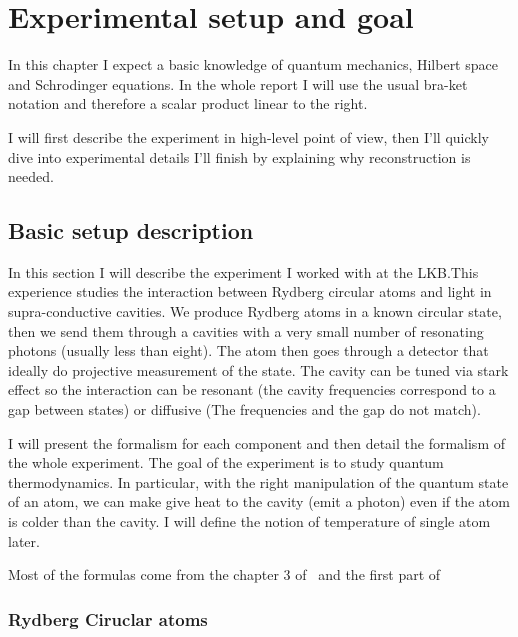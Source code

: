 \documentclass[10pt]{report}
\theoremstyle{plain}
\theoremstyle{definition}
\theoremstyle{remark}
\begin{document}
\vfill



\chapter{Experimental setup and goal}

In this chapter I expect a basic knowledge of quantum mechanics, Hilbert space and
Schrodinger equations. In the whole report I will use the usual bra-ket notation
and therefore a scalar product linear to the right.

I will first describe the experiment in high-level point of view, then I'll
quickly dive into experimental details I'll finish by explaining why
reconstruction is needed.

\section{Basic setup description}

In this section I will describe the experiment I worked with at the LKB.\@ This
experience studies the interaction between Rydberg circular atoms and light in
supra-conductive cavities.
We produce Rydberg atoms in a known circular state, then we send them through a
cavities with a very small number of resonating photons (usually less than
eight). The atom then goes through a detector that ideally do projective
measurement of the state. The cavity can be tuned via stark effect so the
interaction can be resonant (the cavity frequencies correspond to a gap between
states) or diffusive (The frequencies and the gap do not match).

I will present the formalism for each component and then detail the formalism of
the whole experiment. The goal of the experiment is to study quantum
thermodynamics. In particular, with the right manipulation of the quantum state
of an atom, we can make give heat to the cavity (emit a photon) even if the atom
is colder than the cavity. I will define the notion of temperature of single
atom later.

Most of the formulas come from the chapter 3 of~\cite{Har06} and the first part
of~\cite{SayPHD11}


\subsection{Rydberg Ciruclar atoms}

\end{document}
